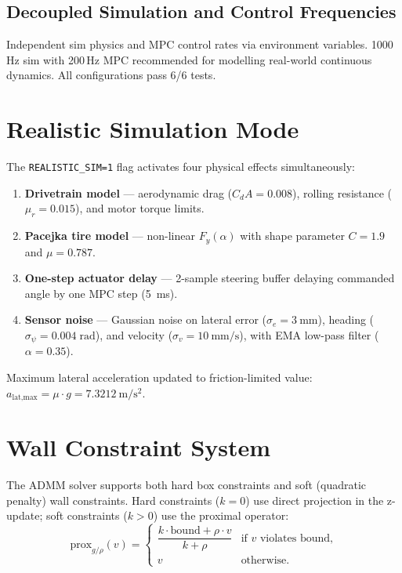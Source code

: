 \documentclass[11pt,a4paper]{article}
\begin{document}
\subsection{Decoupled Simulation and Control Frequencies}
Independent sim physics and MPC control rates via environment variables. 1000\,Hz sim with 200\,Hz MPC recommended for modelling real-world continuous dynamics. All configurations pass 6/6 tests.

\section{Realistic Simulation Mode}
\label{sec:realistic_sim}

The \texttt{REALISTIC\_SIM=1} flag activates four physical effects simultaneously:
\begin{enumerate}
  \item \textbf{Drivetrain model} --- aerodynamic drag ($C_d A = 0.008$), rolling resistance ($\mu_r = 0.015$), and motor torque limits.
  \item \textbf{Pacejka tire model} --- non-linear $F_y(\alpha)$ with shape parameter $C = 1.9$ and $\mu = 0.787$.
  \item \textbf{One-step actuator delay} --- 2-sample steering buffer delaying commanded angle by one MPC step (\SI{5}{\milli\second}).
  \item \textbf{Sensor noise} --- Gaussian noise on lateral error ($\sigma_e = \SI{3}{\milli\meter}$), heading ($\sigma_\psi = 0.004\;\text{rad}$), and velocity ($\sigma_v = \SI{10}{\milli\meter\per\second}$), with EMA low-pass filter ($\alpha = 0.35$).
\end{enumerate}

Maximum lateral acceleration updated to friction-limited value: $a_{\text{lat,max}} = \mu \cdot g = \SI{7.3212}{\metre\per\second\squared}$.

\section{Wall Constraint System}
\label{sec:wall_constraints}

The ADMM solver supports both hard box constraints and soft (quadratic penalty) wall constraints. Hard constraints ($k = 0$) use direct projection in the z-update; soft constraints ($k > 0$) use the proximal operator:
\[
  \text{prox}_{g/\rho}(v) =
  \begin{cases}
    \dfrac{k \cdot \text{bound} + \rho \cdot v}{k + \rho} & \text{if } v \text{ violates bound,} \\[4pt]
    v & \text{otherwise.}
  \end{cases}
\]
\end{document}
